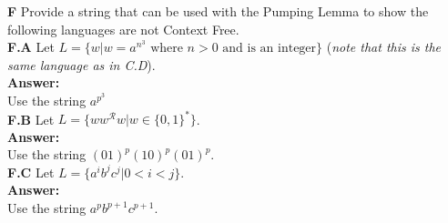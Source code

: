 \documentclass[10pt]{article}
\begin{document}
    \newpage
    \noindent
    \textbf{F} Provide a string that can be used with the Pumping Lemma to show the following languages are not Context Free.\\
    \textbf{F.A} Let $L=\{w|w=a^{n^3} \text{ where } n>0\text{ and is an integer}\}$ (\textit{note that this is the same language as in C.D}).\\


    \noindent
    \textbf{Answer:}\\
    Use the string $a^{p^3}$\\

    \noindent
    \textbf{F.B} Let $L=\{ww^\mathcal{R}w|w\in\{0,1\}^*\}$.\\


    \noindent
    \textbf{Answer:}\\
    Use the string $(01)^p(10)^p(01)^p.$\\

    \noindent
    \textbf{F.C} Let $L=\{a^ib^jc^j|0<i<j\}$.\\

    \noindent
    \textbf{Answer:}\\
    Use the string $a^pb^{p+1}c^{p+1}.$\\

\end{document}
